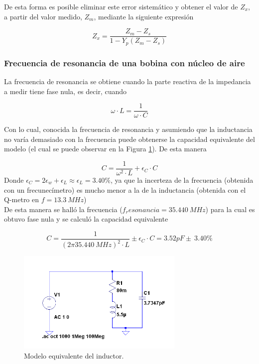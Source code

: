 \documentclass[a4paper,10pt]{article}
\begin{document}
		\indent De esta forma es posible eliminar este error sistem\'atico y 
		obtener el valor de $Z_x$, a partir del valor medido, $Z_m$, mediante la
		siguiente expresi\'on
		
		$$Z_x=\frac{Z_m-Z_s}{1-Y_p(Z_m-Z_s)}$$
		
		\subsubsection{Frecuencia de resonancia de una bobina con n\'ucleo de 
		aire}
		
		\indent La frecuencia de resonancia se obtiene cuando la parte reactiva 
		de la impedancia a medir tiene fase nula, es decir, cuando
		
		$$\omega\cdot L=\frac{1}{\omega \cdot C}$$
		
		\indent Con lo cual, conocida la frecuencia de resonancia y asumiendo 
		que la inductancia no var\'ia demasiado con la frecuencia puede 
		obtenerse la capacidad equivalente del modelo (el cual se puede observar
		en la Figura \ref{inductorequiv}). De esta manera
		
		$$C=\frac{1}{\omega^2 \cdot L}+\epsilon_C \cdot C$$
		\indent Donde $\epsilon_C=2\epsilon_w+\epsilon_L\approx \epsilon_L =
		3.40\%$, ya que la incerteza de la frecuencia (obtenida con un 
		frecunec\'imetro) es mucho menor a la de la inductancia (obtenida con el
		Q-metro en $f=13.3~MHz$) \\
		\indent De esta manera se hall\'o la frecuencia ($f_resonancia=
		35.440~MHz$) para la cual es obtuvo fase nula y se calcul\'o la 
		capacidad equivalente
		
		$$C=\frac{1}{(2\pi 35.440~MHz)^2 \cdot L}\pm \epsilon_C \cdot C=3.52pF \pm~3.40\%$$
		\begin{figure}[!htb]
			\centering
			\includegraphics[width=8cm]
			{Imagenes/induceqquiv.png}
			\caption{Modelo equivalente del inductor.}
			\label{inductorequiv} 
		\end{figure}
		
\end{document}
